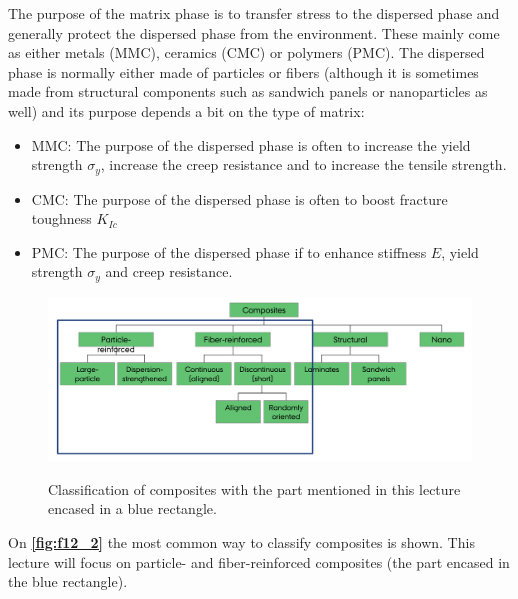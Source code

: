 The purpose of the matrix phase is to transfer stress to the dispersed phase and generally protect the dispersed phase from the environment. These mainly come as either metals (MMC), ceramics (CMC) or polymers (PMC). The dispersed phase is normally either made of particles or fibers (although it is sometimes made from structural components such as sandwich panels or nanoparticles as well) and its purpose depends a bit on the type of matrix:
\begin{itemize}
  \item MMC: The purpose of the dispersed phase is often to increase the yield strength $\sigma_y$, increase the creep resistance and to increase the tensile strength.
  \item CMC: The purpose of the dispersed phase is often to boost fracture toughness $K_{Ic}$
  \item PMC: The purpose of the dispersed phase if to enhance stiffness $E$, yield strength $\sigma_y$ and creep resistance.
\end{itemize}

\begin{figure} [ht]
  \centering
  \caption{Classification of composites with the part mentioned in this lecture encased in a blue rectangle.}
  \includegraphics[width=0.75\linewidth]{./figures/f12_2.png}
  \label{fig:f12_2}
\end{figure}
On \textbf{\autoref{fig:f12_2}} the most common way to classify composites is shown. This lecture will focus on particle- and fiber-reinforced composites (the part encased in the blue rectangle).


